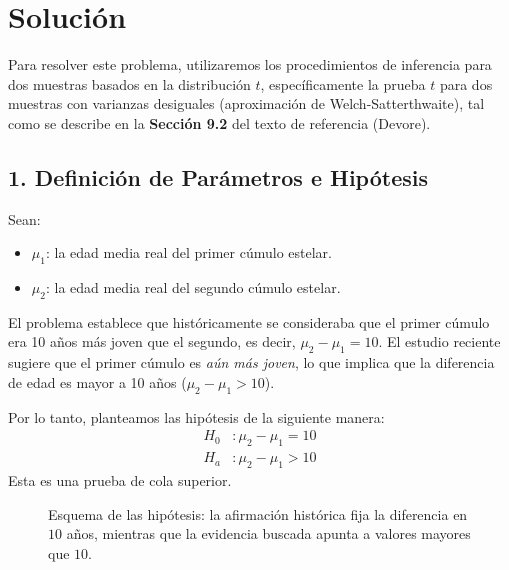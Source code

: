 \documentclass[12pt]{article}
\begin{document}
\section*{Solución}

Para resolver este problema, utilizaremos los procedimientos de inferencia para dos muestras basados en la distribución $t$, específicamente la prueba $t$ para dos muestras con varianzas desiguales (aproximación de Welch-Satterthwaite), tal como se describe en la \textbf{Sección 9.2} del texto de referencia (Devore).

\subsection*{1. Definición de Parámetros e Hipótesis}

Sean:
\begin{itemize}
    \item $\mu_1$: la edad media real del primer cúmulo estelar.
    \item $\mu_2$: la edad media real del segundo cúmulo estelar.
\end{itemize}

El problema establece que históricamente se consideraba que el primer cúmulo era 10 años más joven que el segundo, es decir, $\mu_2 - \mu_1 = 10$. El estudio reciente sugiere que el primer cúmulo es \textit{aún más joven}, lo que implica que la diferencia de edad es mayor a 10 años ($\mu_2 - \mu_1 > 10$).

Por lo tanto, planteamos las hipótesis de la siguiente manera:
\begin{align*}
    H_0 &: \mu_2 - \mu_1 = 10 \\
    H_a &: \mu_2 - \mu_1 > 10
\end{align*}
Esta es una prueba de cola superior.

\begin{figure}[H]
\centering
{}
\caption{Esquema de las hipótesis: la afirmación histórica fija la diferencia en $10$ años, mientras que la evidencia buscada apunta a valores mayores que $10$.}
\end{figure}
\end{document}
